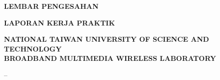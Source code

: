 %

\fontsize{11}{16}\selectfont

\begin{center}
    \textbf{LEMBAR PENGESAHAN}
    
    \vspace{0.2cm}
    
    \textbf{LAPORAN KERJA PRAKTIK}
    
    \vspace{1cm}
    
    \textbf{NATIONAL TAIWAN UNIVERSITY OF SCIENCE AND TECHNOLOGY} \\
    \textbf{BROADBAND MULTIMEDIA WIRELESS LABORATORY}
    
    \vspace{0.5cm}
    
    \textbf{\judul}
    
    \vspace{0.5cm}
    
    \startMagang -- \akhirMagang
\end{center}

\vspace{2cm} %


